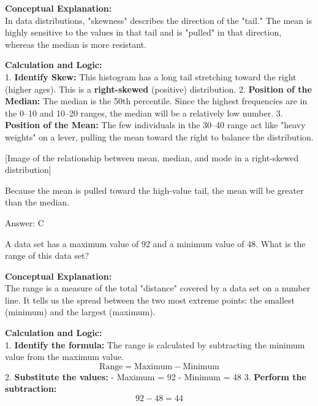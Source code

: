 \documentclass[11pt,paper=a4,answers]{exam}
\begin{document}
\begin{questions}
\begin{solution}
\textbf{Conceptual Explanation:} \\
In data distributions, "skewness" describes the direction of the "tail." The mean is highly sensitive to the values in that tail and is "pulled" in that direction, whereas the median is more resistant.

\vspace{30pt}

\textbf{Calculation and Logic:} \\
1. \textbf{Identify Skew:} This histogram has a long tail stretching toward the right (higher ages). This is a \textbf{right-skewed} (positive) distribution.
2. \textbf{Position of the Median:} The median is the 50th percentile. Since the highest frequencies are in the 0--10 and 10--20 ranges, the median will be a relatively low number.
3. \textbf{Position of the Mean:} The few individuals in the 30--40 range act like "heavy weights" on a lever, pulling the mean toward the right to balance the distribution.

[Image of the relationship between mean, median, and mode in a right-skewed distribution]

\vspace{20pt}

Because the mean is pulled toward the high-value tail, the mean will be greater than the median.

\vspace{30pt}

Answer: \colorbox{yellow!100}{C}
\end{solution}

\question
A data set has a maximum value of 92 and a minimum value of 48. What is the range of this data set?

\begin{solution}
\textbf{Conceptual Explanation:} \\
The range is a measure of the total "distance" covered by a data set on a number line. It tells us the spread between the two most extreme points: the smallest (minimum) and the largest (maximum).

\vspace{30pt}

\textbf{Calculation and Logic:} \\
1. \textbf{Identify the formula:} The range is calculated by subtracting the minimum value from the maximum value.
\[ \text{Range} = \text{Maximum} - \text{Minimum} \]
2. \textbf{Substitute the values:} 
   - Maximum = 92
   - Minimum = 48
3. \textbf{Perform the subtraction:} 
\[ 92 - 48 = 44 \]


\end{solution}
\end{questions}
\end{document}

